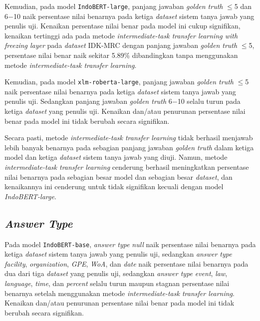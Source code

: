Kemudian, pada model \texttt{IndoBERT-large}, panjang jawaban \emph{golden truth} $\leq$5 dan 6$-$10 naik persentase nilai benarnya pada ketiga \emph{dataset} sistem tanya jawab yang penulis uji. Kenaikan persentase nilai benar pada model ini cukup signifikan, kenaikan tertinggi ada pada metode \emph{intermediate-task transfer learning with freezing layer} pada \emph{dataset} IDK-MRC dengan panjang jawaban \emph{golden truth} $\leq$5, persentase nilai benar naik sekitar 5.89\% dibandingkan tanpa menggunakan metode \emph{intermediate-task transfer learning}.

Kemudian, pada model \texttt{xlm-roberta-large}, panjang jawaban \emph{golden truth} $\leq$5 naik persentase nilai benarnya pada ketiga \emph{dataset} sistem tanya jawab yang penulis uji. Sedangkan panjang jawaban \emph{golden truth} 6$-$10 selalu turun pada ketiga \emph{dataset} yang penulis uji. Kenaikan dan/atau penurunan persentase nilai benar pada model ini tidak berubah secara signifikan.

Secara pasti, metode \emph{intermediate-task transfer learning} tidak berhasil menjawab lebih banyak benarnya pada sebagian panjang jawaban \emph{golden truth} dalam ketiga model dan ketiga \emph{dataset} sistem tanya jawab yang diuji. Namun, metode \emph{intermediate-task transfer learning} cenderung berhasil meningkatkan persentase nilai benarnya pada sebagian besar model dan sebagian besar \emph{dataset}, dan kenaikannya ini cenderung untuk tidak signifikan kecuali dengan model \emph{IndoBERT-large}.

\subsection{\emph{Answer Type}}
Pada model \texttt{IndoBERT-base}, \emph{answer type} \emph{null} naik persentase nilai benarnya pada ketiga \emph{dataset} sistem tanya jawab yang penulis uji, sedangkan \emph{answer type} \emph{facility}, \emph{organization}, \emph{GPE}, \emph{WoA}, dan \emph{date} naik persentase nilai benarnya pada dua dari tiga \emph{dataset} yang penulis uji, sedangkan \emph{answer type} \emph{event}, \emph{law}, \emph{language}, \emph{time}, dan \emph{percent} selalu turun maupun stagnan persentase nilai benarnya setelah menggunakan metode \emph{intermediate-task transfer learning}. Kenaikan dan/atau penurunan persentase nilai benar pada model ini tidak berubah secara signifikan.

